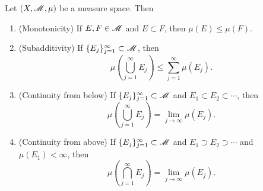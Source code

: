 \documentclass[12pt]{article} %
\begin{document}
\begin{theorem}
    Let $(X, \mathscr{M}, \mu)$ be a measure space. Then \begin{enumerate}
        \item (Monotonicity) If $E, F \in \mathscr{M}$ and $E \subset F$, then $\mu(E) \leq \mu(F)$.
        \item (Subadditivity) If $\{E_j\}_{j=1}^{\infty} \subset \mathscr{M}$, then \[\mu\left(\bigcup_{j=1}^{\infty} E_j \right) \leq \sum_{j=1}^{\infty} \mu(E_j).\]
        \item (Continuity from below) If $\{E_j\}_{j=1}^{\infty} \subset \mathscr{M}$ and $E_1 \subset E_2 \subset \cdots$, then \[\mu\left(\bigcup_{j=1}^{\infty} E_j \right) = \lim_{j\to \infty} \mu(E_j).\]
        \item (Continuity from above) If $\{E_j\}_{j=1}^{\infty} \subset \mathscr{M}$ and $E_1 \supset E_2 \supset \cdots$ and $\mu(E_1) < \infty$, then \[\mu\left(\bigcap_{j=1}^{\infty}E_j\right) = \lim_{j\to \infty} \mu(E_j).\]
    \end{enumerate}
\end{theorem}
\end{document}
